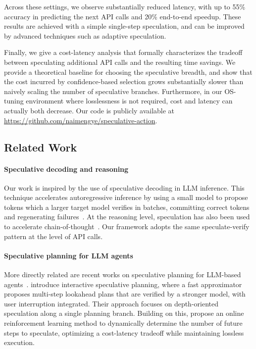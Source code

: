 \documentclass{article} %
\theoremstyle{plain} %
\theoremstyle{definition} %
\theoremstyle{remark} %
\begin{document}
Across these settings, we observe substantially reduced latency, with up to 55\% accuracy in predicting the next API calls and 20\% end-to-end speedup.
These results are achieved with a simple single-step speculation, and can be improved by advanced techniques such as adaptive speculation. 

Finally, we give a cost-latency analysis that formally characterizes the tradeoff between speculating additional API calls and the resulting time savings.
We provide a theoretical baseline for choosing the speculative breadth, %
and show that the cost incurred by confidence-based selection grows substantially slower than naively scaling the number of speculative branches. 
Furthermore, in our OS-tuning environment where losslessness is not required, cost and latency can actually both decrease. Our code is publicly available at \url{https://github.com/naimengye/speculative-action}.


% 
\subsection{Related Work}
\label{sec:related}
\paragraph{Speculative decoding and reasoning}
Our work is inspired by the use of speculative decoding in LLM inference. This technique accelerates autoregressive inference by using a small model to propose tokens which a larger target model verifies in batches, committing correct tokens and regenerating failures~\citep{leviathan2023fast,zhang2024beyond,chen2023acceleratinglargelanguagemodel}.
At the reasoning level, speculation has also been used to accelerate chain-of-thought~\citep{wang2025acceleratinglargelanguagemodel,wang2025efficientreasoningllmsspeculative,fu2025scaling}.
Our framework adopts the same speculate-verify pattern at the level of API calls.

\paragraph{Speculative planning for LLM agents}
More directly related are recent works on speculative planning for LLM-based agents~\citep{hua2024interactivespeculativeplanningenhance,guan2025dynamicspeculativeagentplanning}. 
\citet{hua2024interactivespeculativeplanningenhance} introduce interactive speculative planning, where a fast approximator proposes multi-step lookahead plans that are verified by a stronger model, with user interruption integrated. Their approach focuses on depth-oriented speculation along a single planning branch. Building on this, \citet{guan2025dynamicspeculativeagentplanning} propose an online reinforcement learning method to dynamically determine the number of future steps to speculate, optimizing a cost-latency tradeoff while maintaining lossless execution.
\end{document}
